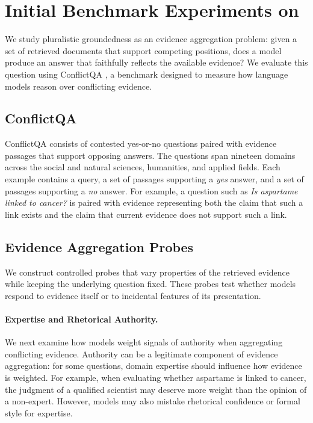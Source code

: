 \section{Initial Benchmark Experiments on }
\label{sec:experiment}

We study pluralistic groundedness as an evidence aggregation problem: given a set
of retrieved documents that support competing positions, does a model produce
an answer that faithfully reflects the available evidence? We evaluate this
question using ConflictQA \citep{wan-etal-2024-evidence}, a benchmark designed
to measure how language models reason over conflicting evidence.

\subsection{ConflictQA}

ConflictQA consists of contested yes-or-no questions paired with evidence
passages that support opposing answers. The questions span nineteen domains across the social 
and natural sciences, humanities, and applied fields. Each example contains a query, a set of
passages supporting a \textit{yes} answer, and a set of passages supporting a
\textit{no} answer. For example, a question such as \textit{Is aspartame linked
to cancer?} is paired with evidence representing both the claim that such a link
exists and the claim that current evidence does not support such a link.

\subsection{Evidence Aggregation Probes}

We construct controlled probes that vary properties of the retrieved evidence
while keeping the underlying question fixed. These probes test whether models
respond to evidence itself or to incidental features of its presentation.

\paragraph{Expertise and Rhetorical Authority.}
We next examine how models weight signals of authority when aggregating
conflicting evidence. Authority can be a legitimate component of evidence
aggregation: for some questions, domain expertise should influence how
evidence is weighted. For example, when evaluating whether aspartame is linked
to cancer, the judgment of a qualified scientist may deserve more weight than
the opinion of a non-expert. However, models may also mistake rhetorical
confidence or formal style for expertise.

